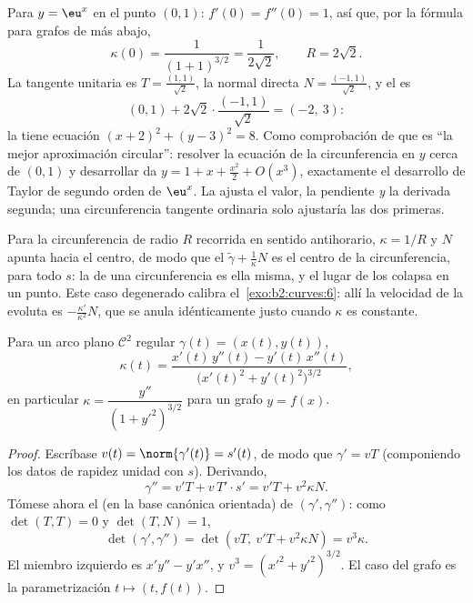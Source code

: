 \begin{example}\label{ex:b2:curves:oscexp}
Para $y = \eu^x$ en el punto $(0, 1)$: $f'(0) = f''(0) = 1$, así
que, por la fórmula para grafos de más abajo,
\[
\kappa(0) = \frac{1}{(1 + 1)^{3/2}} = \frac1{2\sqrt2},
\qquad R = 2\sqrt2 .
\]
La tangente unitaria es $T = \frac{(1, 1)}{\sqrt2}$, la normal
directa $N = \frac{(-1, 1)}{\sqrt2}$, y el  es
\[
(0, 1) + 2\sqrt2\cdot\frac{(-1, 1)}{\sqrt2} = (-2,\ 3) :
\]
la  tiene ecuación $(x + 2)^2 + (y - 3)^2
= 8$. Como comprobación de que es ``la mejor aproximación
circular'': resolver la ecuación de la circunferencia en $y$ cerca de
$(0,1)$ y desarrollar da $y = 1 + x + \frac{x^2}2 + O(x^3)$,
exactamente el desarrollo de Taylor de segundo orden de $\eu^x$. La
 ajusta el valor, la pendiente \emph{y} la
derivada segunda; una circunferencia tangente ordinaria solo
ajustaría las dos primeras.
\end{example}

\begin{example}\label{ex:b2:curves:circleevolute}
Para la circunferencia de radio $R$ recorrida en sentido
antihorario, $\kappa = 1/R$ y $N$ apunta hacia el centro, de modo que
el  $\tilde\gamma + \frac1\kappa N$ es el centro
de la circunferencia, para todo $s$: la 
de una circunferencia es ella misma, y el lugar de los  colapsa en un punto. Este caso degenerado calibra el~\cref{exo:b2:curves:6}: allí la velocidad de la evoluta es
$-\frac{\kappa'}{\kappa^2}N$, que se anula idénticamente justo
cuando $\kappa$ es constante.
\end{example}

\begin{proposition}\label{prop:b2:curves:kappaformula}
Para un arco plano $\mathcal{C}^2$ regular $\gamma(t) = (x(t),
y(t))$,
\[
\kappa(t)
= \frac{x'(t)\,y''(t) - y'(t)\,x''(t)}
       {\bigl(x'(t)^2 + y'(t)^2\bigr)^{3/2}} ,
\]
en particular $\kappa = \dfrac{y''}{(1 + y'^2)^{3/2}}$ para un grafo
$y = f(x)$.
\end{proposition}

\begin{proof}
Escríbase $v(t) = \norm{\gamma'(t)} = s'(t)$, de modo que $\gamma' =
vT$ (componiendo los datos de rapidez unidad con $s$). Derivando,
\[
\gamma'' = v'T + v\,T'\cdot s' = v'T + v^2\kappa N .
\]
Tómese ahora el  (en la base canónica orientada) de
$(\gamma', \gamma'')$: como $\det(T, T) = 0$ y $\det(T, N) = 1$,
\[
\det(\gamma', \gamma'') = \det(vT,\ v'T + v^2\kappa N)
= v^3\kappa .
\]
El miembro izquierdo es $x'y'' - y'x''$, y $v^3 = (x'^2 +
y'^2)^{3/2}$. El caso del grafo es la parametrización $t \mapsto (t,
f(t))$.
\end{proof}

